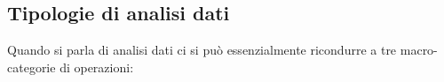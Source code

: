 
\newpage


\subsection{Tipologie di analisi dati}
\label{subsec:tipologie analisi dati}

	Quando si parla di analisi dati ci si può essenzialmente ricondurre a tre macro-categorie di operazioni:
	
